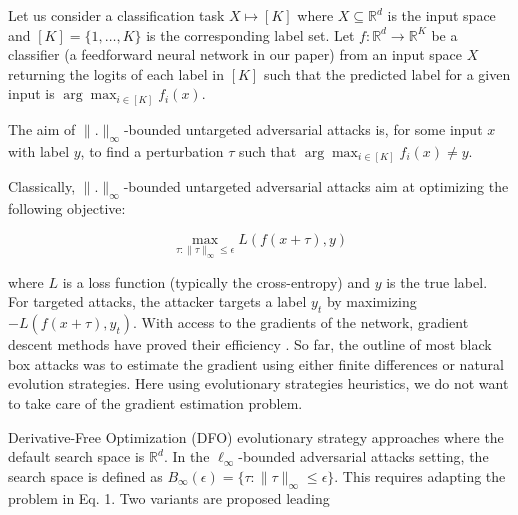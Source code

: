 
Let us consider a classification task $X \mapsto [K]$ where $X \subseteq \mathbb{R}^d$ is the input space and $[K] = \{1, \ldots, K\}$ is the corresponding label set. Let $f : \mathbb{R}^d \to \mathbb{R}^K$ be a classifier (a feedforward neural network in our paper) from an input space $X$ returning the logits of each label in $[K]$ such that the predicted label for a given input is $\arg \max_{i \in [K]} f_i(x)$.

The aim of $\|.\|_\infty$-bounded untargeted adversarial attacks is, for some input $x$ with label $y$, to find a perturbation $\tau$ such that $\arg \max_{i \in [K]} f_i(x) \neq y$.

Classically, $\|.\|_\infty$-bounded untargeted adversarial attacks aim at optimizing the following objective:

\[
\max_{\tau: \|\tau\|_\infty \leq \epsilon} L(f(x + \tau), y)
\]

where $L$ is a loss function (typically the cross-entropy) and $y$ is the true label. For targeted attacks, the attacker targets a label $y_t$ by maximizing $-L(f(x + \tau), y_t)$. With access to the gradients of the network, gradient descent methods have proved their efficiency \cite{Kurakin2016, Madry2018a}. So far, the outline of most black box attacks was to estimate the gradient using either finite differences or natural evolution strategies. Here using evolutionary strategies heuristics, we do not want to take care of the gradient estimation problem.

Derivative-Free Optimization (DFO) evolutionary strategy approaches where the default search space is $\mathbb{R}^d$. In the $\ell_\infty$-bounded adversarial attacks setting, the search space is defined as $B_\infty(\epsilon) = \{\tau : \|\tau\|_\infty \leq \epsilon\}$. This requires adapting the problem in Eq. 1. Two variants are proposed leading
